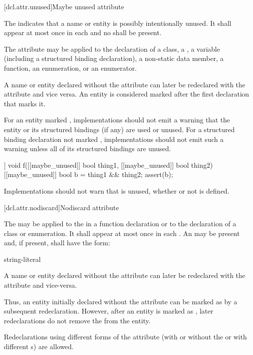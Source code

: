 [dcl.attr.unused]{Maybe unused attribute}%

\pnum
The  
indicates that a name or entity is possibly intentionally unused.
It shall appear at most once in each  and
no  shall be present.

\pnum
The attribute may be applied to the declaration of a class,
a ,
a variable (including a structured binding declaration),
a non-static data member,
a function, an enumeration, or an enumerator.

\pnum
A name or entity declared without the  attribute
can later be redeclared with the attribute
and vice versa.
An entity is considered marked
after the first declaration that marks it.

\pnum
\recommended
For an entity marked ,
implementations should not emit a warning
that the entity or its structured bindings (if any)
are used or unused.
For a structured binding declaration not marked ,
implementations should not emit such a warning unless
all of its structured bindings are unused.

\pnum
\begin{example}
\begin{codeblock}
[[maybe_unused]] void f([[maybe_unused]] bool thing1,
                        [[maybe_unused]] bool thing2) {
  [[maybe_unused]] bool b = thing1 && thing2;
  assert(b);
}
\end{codeblock}
Implementations should not warn that  is unused,
whether or not  is defined.
\end{example}

[dcl.attr.nodiscard]{Nodiscard attribute}%

\pnum
The  
may be applied to the 
in a function declaration or to the declaration of a class or enumeration.
It shall appear at most once in each .
An  may be present
and, if present, shall have the form:

\begin{ncbnf}
\terminal{(} string-literal \terminal{)}
\end{ncbnf}

\pnum
A name or entity declared without the  attribute
can later be redeclared with the attribute and vice-versa.
\begin{note}
Thus, an entity initially declared without the attribute
can be marked as 
by a subsequent redeclaration.
However, after an entity is marked as ,
later redeclarations do not remove the 
from the entity.
\end{note}
Redeclarations using different forms of the attribute
(with or without the 
or with different s)
are allowed.

